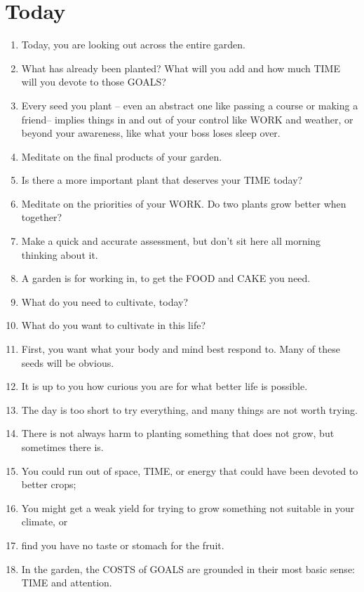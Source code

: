 \documentclass[
]{book}
\begin{document}
\hypertarget{today}{%
\section{Today}\label{today}}

\begin{enumerate}
\def\labelenumi{\arabic{enumi}.}
\setcounter{enumi}{18}
\item
  Today, you are looking out across the entire garden.
\item
  What has already been planted? What will you add and how much TIME will you
  devote to those GOALS?
\item
  Every seed you plant -- even an abstract one like passing a course or making a
  friend-- implies things in and out of your control like WORK and weather, or
  beyond your awareness, like what your boss loses sleep over.
\item
  Meditate on the final products of your garden.
\item
  Is there a more important plant that deserves your TIME today?
\item
  Meditate on the priorities of your WORK. Do two plants grow better when
  together?
\item
  Make a quick and accurate assessment, but don't sit here all morning thinking
  about it.
\item
  A garden is for working in, to get the FOOD and CAKE you need.
\item
  What do you need to cultivate, today?
\item
  What do you want to cultivate in this life?
\item
  First, you want what your body and mind best respond to. Many of these seeds
  will be obvious.
\item
  It is up to you how curious you are for what better life is possible.
\item
  The day is too short to try everything, and many things are not worth trying.
\item
  There is not always harm to planting something that does not grow, but
  sometimes there is.
\item
  You could run out of space, TIME, or energy that could have been devoted to
  better crops;
\item
  You might get a weak yield for trying to grow something not suitable in your
  climate, or
\item
  find you have no taste or stomach for the fruit.
\item
  In the garden, the COSTS of GOALS are grounded in their most basic sense: TIME
  and attention.
\end{enumerate}
\end{document}
